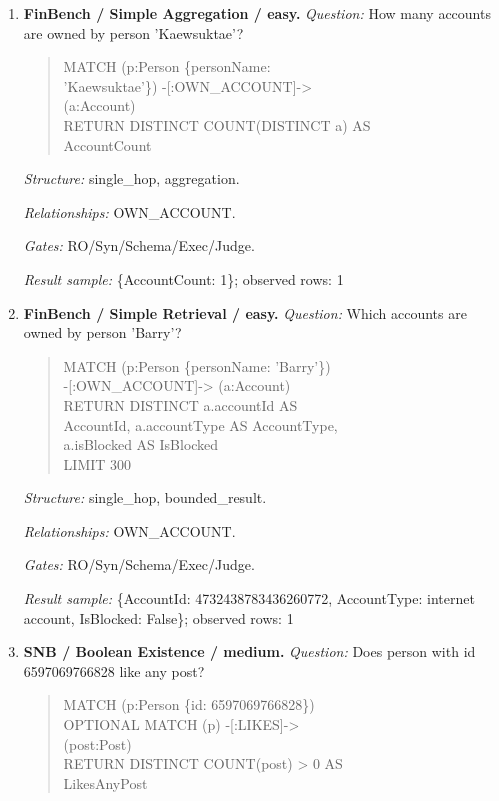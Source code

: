 \begin{enumerate}
\item \textbf{FinBench / Simple Aggregation / easy.}
\textit{Question:} How many accounts are owned by person 'Kaewsuktae'?
\begin{quote}\scriptsize\ttfamily\raggedright\sloppy
MATCH (p:Person \{personName:\\
'Kaewsuktae'\}) -[:OWN\_ACCOUNT]-\textgreater{}\\
(a:Account)\\
RETURN DISTINCT COUNT(DISTINCT a) AS\\
AccountCount
\end{quote}
\textit{Structure:} single\_hop, aggregation.\par
\textit{Relationships:} OWN\_ACCOUNT.\par
\textit{Gates:} RO/Syn/Schema/Exec/Judge.\par
\textit{Result sample:} \{AccountCount: 1\}; observed rows: 1
\item \textbf{FinBench / Simple Retrieval / easy.}
\textit{Question:} Which accounts are owned by person 'Barry'?
\begin{quote}\scriptsize\ttfamily\raggedright\sloppy
MATCH (p:Person \{personName: 'Barry'\})\\
-[:OWN\_ACCOUNT]-\textgreater{} (a:Account)\\
RETURN DISTINCT a.accountId AS\\
AccountId, a.accountType AS AccountType,\\
a.isBlocked AS IsBlocked\\
LIMIT 300
\end{quote}
\textit{Structure:} single\_hop, bounded\_result.\par
\textit{Relationships:} OWN\_ACCOUNT.\par
\textit{Gates:} RO/Syn/Schema/Exec/Judge.\par
\textit{Result sample:} \{AccountId: 4732438783436260772, AccountType: internet account, IsBlocked: False\}; observed rows: 1
\item \textbf{SNB / Boolean Existence / medium.}
\textit{Question:} Does person with id 6597069766828 like any post?
\begin{quote}\scriptsize\ttfamily\raggedright\sloppy
MATCH (p:Person \{id: 6597069766828\})\\
OPTIONAL MATCH (p) -[:LIKES]-\textgreater{}\\
(post:Post)\\
RETURN DISTINCT COUNT(post) \textgreater{} 0 AS\\
LikesAnyPost

\end{quote}
\end{enumerate}
